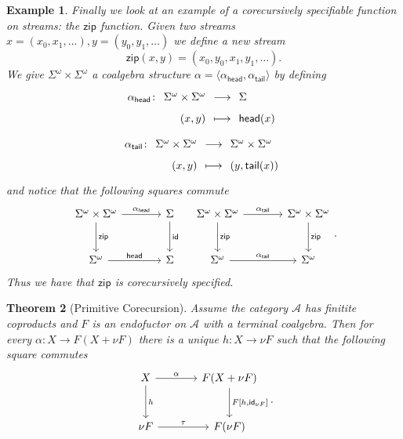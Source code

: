\documentclass[letterpaper, 11pt, oneside]{memoir}
\theoremstyle{myteo}
\newtheorem{theorem}{Theorem}[section]
\newtheorem{example}[theorem]{Example}
\numberwithin{equation}{section}
\newcommand{\id}{\textsf{id}}
\newcommand{\head}{\textsf{head}}
\newcommand{\tail}{\textsf{tail}}
\newcommand{\A}{\mathscr{A}}
\newcommand{\outofcoprod}[2]{{[#1, #2]}}
\newcommand{\intoprod}[2]{{\langle #1, #2\rangle}}
\newcommand{\fundef}[5]{\begin{align*}
    #1\colon\begin{tikzcd}[sep=large]#2\end{tikzcd} &\longrightarrow \begin{tikzcd}[sep=large]#3\end{tikzcd}\\
      \begin{tikzcd}[sep=large]#4\end{tikzcd} &\longmapsto \begin{tikzcd}[sep=large]#5\end{tikzcd}
\end{align*}}
\begin{document}
\begin{example}
  Finally we look at an example of a corecursively specifiable function on streams: the \(\textsf{zip}\) function.
  Given two streams \(x = (x_0, x_1, \ldots), y = (y_0, y_1, \ldots)\) we define a new stream
  \begin{equation*}
    \textsf{zip}(x, y) = (x_0, y_0, x_1, y_1, \ldots).
  \end{equation*}
  We give \(\Sigma^\omega \times \Sigma^\omega\) a coalgebra structure \(\alpha = \intoprod{\alpha_\head}{\alpha_\tail}\) by defining
  \fundef{\alpha_\head}{\Sigma^\omega \times \Sigma^\omega}{\Sigma}{(x, y)}{\head(x)}
  \fundef{\alpha_\tail}{\Sigma^\omega \times \Sigma^\omega}{\Sigma^\omega \times \Sigma^\omega}{(x, y)}{(y, \tail(x))}
  and notice that the following squares commute
  \begin{equation*}
    \begin{tikzcd}[sep = large]
      \Sigma^\omega \times \Sigma^\omega \ar[r, "\alpha_\head"] \ar[d, "\textsf{zip}"] & \Sigma \ar[d, "\id"] \\
      \Sigma^\omega \ar[r, "\head"] & \Sigma
    \end{tikzcd}\quad
    \begin{tikzcd}[sep = large]
      \Sigma^\omega \times \Sigma^\omega \ar[r, "\alpha_\tail"] \ar[d, "\textsf{zip}"] & \Sigma^\omega \times \Sigma^\omega \ar[d, "\textsf{zip}"] \\
      \Sigma^\omega \ar[r, "\alpha_\tail"] & \Sigma^\omega
    \end{tikzcd}.
  \end{equation*}
  Thus we have that \(\textsf{zip}\) is corecursively specified.
\end{example}

\begin{theorem}[Primitive Corecursion]
  \label{th:primitive_corecursion}
  Assume the category \(\A\) has finitite coproducts and \(F\) is an endofuctor on \(\A\) with a terminal coalgebra.
  Then for every \(\alpha : X \to F(X + \nu F)\) there is a unique \(h : X \to \nu F\) such that the following square commutes
  \begin{equation*}
    \begin{tikzcd}[sep = large]
      X \ar[r, "\alpha"] \ar[d, "h"] & F(X + \nu F) \ar[d, "F\outofcoprod{h}{\id_{\nu F}}"]\\
      \nu F \ar[r, "\tau"] & F(\nu F)
    \end{tikzcd}.
  \end{equation*}
\end{theorem}
\end{document}
